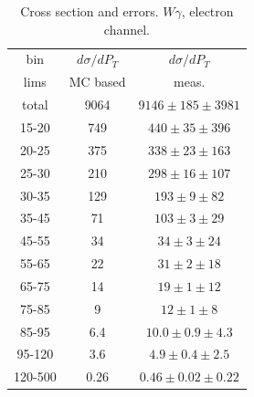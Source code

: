 \begin{table}[h]
  \scriptsize
  \begin{center}
  \caption{Cross section and errors. $W\gamma$, electron channel.}
  \begin{tabular}{|c|c|c|}
    bin & $d\sigma/dP_{T}$ &$d\sigma/dP_{T}$ \\ 
    lims & MC based &    meas.       \\ \hline
    total & 9064 & $9146 \pm 185 \pm 3981$ \\ \hline
    15-20 & 749 & $440 \pm 35 \pm 396$ \\ \hline
    20-25 & 375 & $338 \pm 23 \pm 163$ \\ \hline
    25-30 & 210 & $298 \pm 16 \pm 107$ \\ \hline
    30-35 & 129 & $193 \pm 9 \pm 82$ \\ \hline
    35-45 & 71 & $103 \pm 3 \pm 29$ \\ \hline
    45-55 & 34 & $34 \pm 3 \pm 24$ \\ \hline
    55-65 & 22 & $31 \pm 2 \pm 18$ \\ \hline
    65-75 & 14 & $19 \pm 1 \pm 12$ \\ \hline
    75-85 & 9 & $12 \pm 1 \pm 8$ \\ \hline
    85-95 & 6.4 & $10.0 \pm 0.9 \pm 4.3$ \\ \hline
    95-120 & 3.6 & $4.9 \pm 0.4 \pm 2.5$ \\ \hline
    120-500 & 0.26 & $0.46 \pm 0.02 \pm 0.22$ \\ \hline
  \end{tabular}
  \label{tab:sc_mc_vs_meas_ELECTRON_WGamma}
  \end{center}
\end{table}
 
